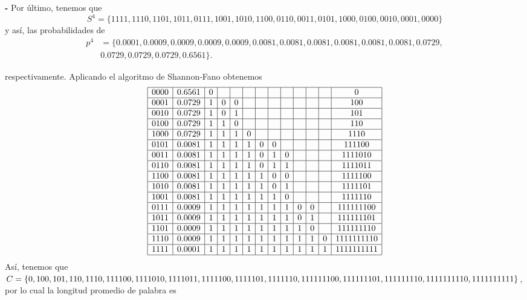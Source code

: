 \begin{sol}
\textbf{-} Por último, tenemos que $$S^{4} =\{1111 ,1110 ,1101,1011, 0111, 1001, 1010, 1100, 0110, 0011, 0101, 1000, 0100, 0010, 0001 ,0000\}$$ y así, las probabilidades de 
\begin{align*}
   p^{4}&=\{0\text{.}0001 , 0\text{.}0009 , 0\text{.}0009 , 0\text{.}0009, 0\text{.}0009 , 0\text{.}0081 , 0\text{.}0081, 0\text{.}0081, 0\text{.}0081, 0\text{.}0081, 0\text{.}0081, 0\text{.}0729,\\
& 0\text{.}0729, 0\text{.}0729, 0\text{.}0729, 0.6561\}  
.\end{align*}



respectivamente. Aplicando el algoritmo de Shannon-Fano obtenemos  
\[
\begin{array}{|c|c|c|c|c|c|c|c|c|c|c|c|c|}
\hline
0000& 0.6561 & 0& &&&&&&&&&0\\
\hline
0001& 0.0729 &1 &0 &0 & & & & & & & &100 \\
\hline
0010& 0.0729 & 1& 0& 1& & & & & & & & 101\\
\hline
0100& 0.0729 & 1& 1&0 & & & & & & & & 110\\
\hline
1000& 0.0729 & 1& 1& 1&0 & & & & & & & 1110\\
\hline
0101& 0.0081 & 1& 1& 1& 1& 0&0 & & & & & 111100\\
\hline
0011& 0.0081 &1 & 1& 1& 1& 0& 1&0 & & & & 1111010\\
\hline
0110& 0.0081 & 1& 1& 1& 1& 0& 1& 1& & & & 1111011\\
\hline
1100& 0.0081 & 1& 1& 1& 1& 1& 0&0 & & & & 1111100\\
\hline
1010& 0.0081 & 1& 1& 1& 1& 1& 0& 1& & & & 1111101\\
\hline
1001& 0.0081 & 1& 1& 1& 1& 1& 1& 0& & & & 1111110\\
\hline
0111& 0.0009 & 1& 1& 1& 1& 1& 1& 1& 0&0 & &111111100 \\
\hline
1011& 0.0009  & 1&1 & 1& 1& 1& 1& 1& 0&1 & & 111111101\\
\hline
1101& 0.0009  & 1& 1& 1& 1& 1& 1& 1& 1& 0& & 111111110\\
\hline
1110& 0.0009  & 1& 1& 1& 1& 1& 1& 1& 1& 1&0 & 1111111110\\
\hline
1111& 0.0001  & 1& 1& 1& 1& 1& 1& 1& 1& 1& 1&  1111111111\\
\hline
\end{array}
\]
Así, tenemos que $C=\{ 0, 100, 101, 110, 1110, 111100, 1111010, 1111011, 1111100, 1111101,\\ 
1111110,  111111100, 111111101, 111111110, 1111111110, 1111111111\}$, por lo cual la longitud promedio de palabra es 

\end{sol}
